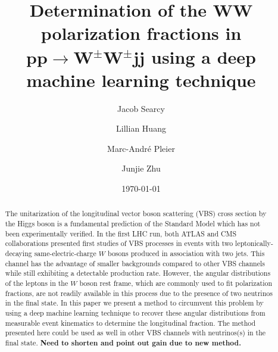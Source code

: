 \documentclass[aps,prl,twocolumn,showpacs,superscriptaddress,groupeaddress,floatfix]{revtex4}  %
\newcommand{\fixme}[1]{{\color{red} \bf #1}}
\begin{document}
\title{Determination of the $\boldsymbol{WW}$ polarization fractions in $\boldsymbol{pp \rightarrow W^\pm W^\pm jj}$ using a deep machine learning technique}
\author{Jacob Searcy}
\author{Lillian Huang}
\author{Marc-Andr\'e Pleier}
\author{Junjie Zhu}

\date{\today}

\begin{abstract}
The unitarization of the longitudinal vector boson scattering (VBS) cross section by the Higgs boson is 
a fundamental prediction of the Standard Model which has not been experimentally verified. In the first LHC run, 
both ATLAS and CMS collaborations presented first studies of VBS processes in events with two leptonically-decaying same-electric-charge 
$W$ bosons produced in association with two jets. This channel has the advantage of smaller backgrounds 
compared to other VBS channels while still exhibiting a detectable production rate. However, the angular distributions of the leptons in the $W$ boson rest frame, which are commonly used to 
fit polarization fractions, are not readily available in this process due to the presence of two neutrinos in the final state. 
In this paper we present a method to circumvent this problem by using a deep machine learning technique to recover these angular distributions from measurable event kinematics to determine the longitudinal fraction.  The method presented here could be used as well in other VBS channels with neutrinos(s) in the final state. \fixme{Need to shorten and point out gain due to new method.}
\end{abstract}

\maketitle


\end{document}
